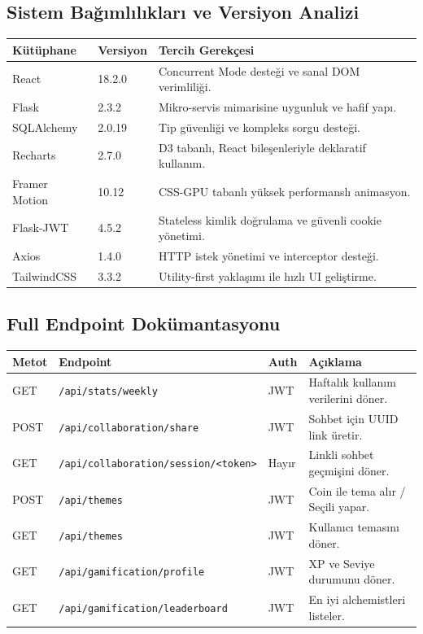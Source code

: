 \documentclass[12pt,a4paper]{article}
\begin{document}
\subsection{Sistem Bağımlılıkları ve Versiyon Analizi}
\begin{longtable}{@{} P{3.5cm} P{2.5cm} P{8cm} @{}}
\toprule
\textbf{Kütüphane} & \textbf{Versiyon} & \textbf{Tercih Gerekçesi} \\
\midrule
React & 18.2.0 & Concurrent Mode desteği ve sanal DOM verimliliği. \\
Flask & 2.3.2 & Mikro-servis mimarisine uygunluk ve hafif yapı. \\
SQLAlchemy & 2.0.19 & Tip güvenliği ve kompleks sorgu desteği. \\
Recharts & 2.7.0 & D3 tabanlı, React bileşenleriyle deklaratif kullanım. \\
Framer Motion & 10.12 & CSS-GPU tabanlı yüksek performanslı animasyon. \\
Flask-JWT & 4.5.2 & Stateless kimlik doğrulama ve güvenli cookie yönetimi. \\
Axios & 1.4.0 & HTTP istek yönetimi ve interceptor desteği. \\
TailwindCSS & 3.3.2 & Utility-first yaklaşımı ile hızlı UI geliştirme. \\
\bottomrule
\end{longtable}

\subsection{Full Endpoint Dokümantasyonu}
\begin{longtable}{@{} P{1.5cm} P{6cm} P{2.5cm} P{4.5cm} @{}}
\toprule
\textbf{Metot} & \textbf{Endpoint} & \textbf{Auth} & \textbf{Açıklama} \\
\midrule
GET & \texttt{/api/stats/weekly} & JWT & Haftalık kullanım verilerini döner. \\
POST & \texttt{/api/collaboration/share} & JWT & Sohbet için UUID link üretir. \\
GET & \texttt{/api/collaboration/session/<token>} & Hayır & Linkli sohbet geçmişini döner. \\
POST & \texttt{/api/themes} & JWT & Coin ile tema alır / Seçili yapar. \\
GET & \texttt{/api/themes} & JWT & Kullanıcı temasını döner. \\
GET & \texttt{/api/gamification/profile} & JWT & XP ve Seviye durumunu döner. \\
GET & \texttt{/api/gamification/leaderboard} & JWT & En iyi alchemistleri listeler. \\
\bottomrule
\end{longtable}
\end{document}
